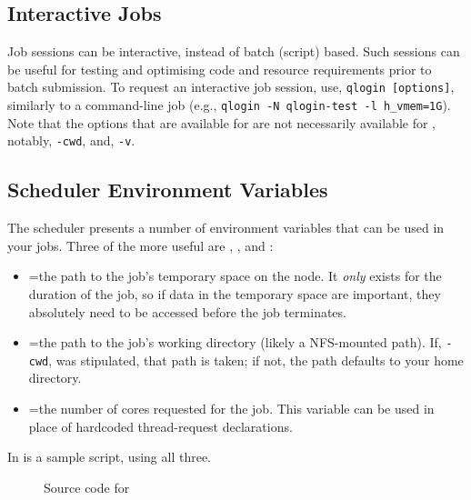 \documentclass{easychair}
\begin{document}
\subsection{Interactive Jobs}

Job sessions can be interactive, instead of batch (script) based. Such 
sessions can be useful for testing and optimising code and resource 
requirements prior to batch submission. To request an interactive job 
session, use, \texttt{qlogin [options]}, similarly to a 
 command-line job (e.g., \texttt{qlogin -N qlogin-test -l h\_vmem=1G}).
Note that the options that are available for  are not necessarily
available for , notably, \texttt{-cwd}, and, \texttt{-v}. 

\subsection{Scheduler Environment Variables}

The scheduler presents a number of environment variables that can be used in 
your jobs. Three of the more useful are , , 
and :

\begin{itemize}
\item
{}=the path to the job's temporary space on the node. It \emph{only} exists for the duration of the job, so if data in the temporary space are important, they absolutely need to be accessed before the job terminates.

\item
{}=the path to the job's working directory (likely a NFS-mounted path). If, \texttt{-cwd}, was stipulated, that path is taken; if not, the path defaults to your home directory.

\item
{}=the number of cores requested for the job. This variable can be used in place of hardcoded thread-request declarations. 
\end{itemize}

\noindent
In  is a sample script, using all three.

\begin{figure}[htpb]
    
    \caption{Source code for }
	\label{fig:tmpdir.sh}
\end{figure}
\end{document}
